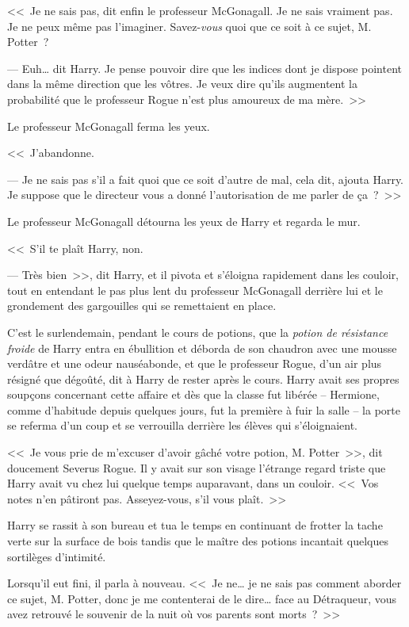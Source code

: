 \later

<<~Je ne sais pas, dit enfin le professeur McGonagall. Je ne sais vraiment pas. Je ne peux même pas l'imaginer. Savez-\emph{vous} quoi que ce soit à ce sujet, M. Potter~?

--- Euh… dit Harry. Je pense pouvoir dire que les indices dont je dispose pointent dans la même direction que les vôtres. Je veux dire qu'ils augmentent la probabilité que le professeur Rogue n'est plus amoureux de ma mère.~>>

Le professeur McGonagall ferma les yeux.

<<~J'abandonne.

--- Je ne sais pas s'il a fait quoi que ce soit d'autre de mal, cela dit, ajouta Harry. Je suppose que le directeur vous a donné l'autorisation de me parler de ça~?~>>

Le professeur McGonagall détourna les yeux de Harry et regarda le mur.

<<~S'il te plaît Harry, non.

--- Très bien~>>, dit Harry, et il pivota et s'éloigna rapidement dans les couloir, tout en entendant le pas plus lent du professeur McGonagall derrière lui et le grondement des gargouilles qui se remettaient en place.

\later

C'est le surlendemain, pendant le cours de potions, que la \emph{potion de résistance froide} de Harry entra en ébullition et déborda de son chaudron avec une mousse verdâtre et une odeur nauséabonde, et que le professeur Rogue, d'un air plus résigné que dégoûté, dit à Harry de rester après le cours. Harry avait ses propres soupçons concernant cette affaire et dès que la classe fut libérée -- Hermione, comme d'habitude depuis quelques jours, fut la première à fuir la salle -- la porte se referma d'un coup et se verrouilla derrière les élèves qui s'éloignaient.

<<~Je vous prie de m'excuser d'avoir gâché votre potion, M. Potter~>>, dit doucement Severus Rogue. Il y avait sur son visage l'étrange regard triste que Harry avait vu chez lui quelque temps auparavant, dans un couloir. <<~Vos notes n'en pâtiront pas. Asseyez-vous, s'il vous plaît.~>>

Harry se rassit à son bureau et tua le temps en continuant de frotter la tache verte sur la surface de bois tandis que le maître des potions incantait quelques sortilèges d'intimité.

Lorsqu'il eut fini, il parla à nouveau. <<~Je ne… je ne sais pas comment aborder ce sujet, M. Potter, donc je me contenterai de le dire… face au Détraqueur, vous avez retrouvé le souvenir de la nuit où vos parents sont morts~?~>>

